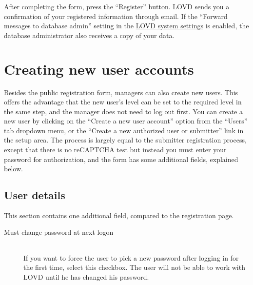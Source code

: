 \documentclass[a4paper,oneside,openany,12pt]{memoir}
\renewenvironment{leftbar}[1][\hsize]
{%
    \def\FrameCommand
    {%
        {\color{LOVDdark}\vrule width 3pt \hspace{5pt}}%
        \colorbox{LOVDlight}%
    }%
    \MakeFramed{\hsize#1\advance\hsize-\width\FrameRestore}%
}
{\endMakeFramed}
\begin{document}
After completing the form, press the ``Register'' button.
LOVD sends you a confirmation of your registered information through email.
If the ``Forward messages to database admin'' setting in the \hyperlink{sec:system_settings}{LOVD system settings} is enabled,
 the database administrator also receives a copy of your data.





\section{Creating new user accounts}
Besides the public registration form, managers can also create new users.
This offers the advantage that the new user's level can be set to the required level in the same step, and the manager does not need to log out first.
You can create a new user by clicking on the ``Create a new user account'' option from the ``Users'' tab dropdown menu,
 or the ``Create a new authorized user or submitter'' link in the setup area.
The process is largely equal to the submitter registration process, except that there is no reCAPTCHA test but
 instead you must enter your password for authorization, and the form has some additional fields, explained below.



\subsection{User details}
This section contains one additional field, compared to the registration page.
\begin{description}
  \item[Must change password at next logon] \hfill \\
  If you want to force the user to pick a new password after logging in for the first time, select this checkbox.
  The user will not be able to work with LOVD until he has changed his password.
\end{description}
\end{document}
